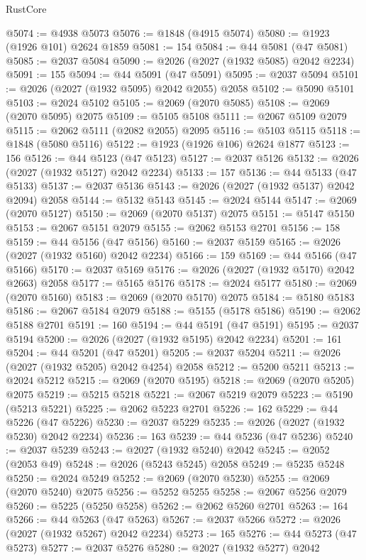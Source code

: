 \begin{lexlean}{RustCore}
\begin{coremodule}
@5074 := @4938 @5073
@5076 := @1848 (@4915 @5074)
@5080 := @1923 (@1926 @101) @2624 @1859
@5081 := 154
@5084 := @44 @5081 (@47 @5081)
@5085 := @2037 @5084
@5090 := @2026 (@2027 (@1932 @5085) @2042 @2234)
@5091 := 155
@5094 := @44 @5091 (@47 @5091)
@5095 := @2037 @5094
@5101 := @2026 (@2027 (@1932 @5095) @2042 @2055) @2058
@5102 := @5090 @5101
@5103 := @2024 @5102
@5105 := @2069 (@2070 @5085)
@5108 := @2069 (@2070 @5095) @2075
@5109 := @5105 @5108
@5111 := @2067 @5109 @2079
@5115 := @2062 @5111 (@2082 @2055) @2095
@5116 := @5103 @5115
@5118 := @1848 (@5080 @5116)
@5122 := @1923 (@1926 @106) @2624 @1877
@5123 := 156
@5126 := @44 @5123 (@47 @5123)
@5127 := @2037 @5126
@5132 := @2026 (@2027 (@1932 @5127) @2042 @2234)
@5133 := 157
@5136 := @44 @5133 (@47 @5133)
@5137 := @2037 @5136
@5143 := @2026 (@2027 (@1932 @5137) @2042 @2094) @2058
@5144 := @5132 @5143
@5145 := @2024 @5144
@5147 := @2069 (@2070 @5127)
@5150 := @2069 (@2070 @5137) @2075
@5151 := @5147 @5150
@5153 := @2067 @5151 @2079
@5155 := @2062 @5153 @2701
@5156 := 158
@5159 := @44 @5156 (@47 @5156)
@5160 := @2037 @5159
@5165 := @2026 (@2027 (@1932 @5160) @2042 @2234)
@5166 := 159
@5169 := @44 @5166 (@47 @5166)
@5170 := @2037 @5169
@5176 := @2026 (@2027 (@1932 @5170) @2042 @2663) @2058
@5177 := @5165 @5176
@5178 := @2024 @5177
@5180 := @2069 (@2070 @5160)
@5183 := @2069 (@2070 @5170) @2075
@5184 := @5180 @5183
@5186 := @2067 @5184 @2079
@5188 := @5155 (@5178 @5186)
@5190 := @2062 @5188 @2701
@5191 := 160
@5194 := @44 @5191 (@47 @5191)
@5195 := @2037 @5194
@5200 := @2026 (@2027 (@1932 @5195) @2042 @2234)
@5201 := 161
@5204 := @44 @5201 (@47 @5201)
@5205 := @2037 @5204
@5211 := @2026 (@2027 (@1932 @5205) @2042 @4254) @2058
@5212 := @5200 @5211
@5213 := @2024 @5212
@5215 := @2069 (@2070 @5195)
@5218 := @2069 (@2070 @5205) @2075
@5219 := @5215 @5218
@5221 := @2067 @5219 @2079
@5223 := @5190 (@5213 @5221)
@5225 := @2062 @5223 @2701
@5226 := 162
@5229 := @44 @5226 (@47 @5226)
@5230 := @2037 @5229
@5235 := @2026 (@2027 (@1932 @5230) @2042 @2234)
@5236 := 163
@5239 := @44 @5236 (@47 @5236)
@5240 := @2037 @5239
@5243 := @2027 (@1932 @5240) @2042
@5245 := @2052 (@2053 @49)
@5248 := @2026 (@5243 @5245) @2058
@5249 := @5235 @5248
@5250 := @2024 @5249
@5252 := @2069 (@2070 @5230)
@5255 := @2069 (@2070 @5240) @2075
@5256 := @5252 @5255
@5258 := @2067 @5256 @2079
@5260 := @5225 (@5250 @5258)
@5262 := @2062 @5260 @2701
@5263 := 164
@5266 := @44 @5263 (@47 @5263)
@5267 := @2037 @5266
@5272 := @2026 (@2027 (@1932 @5267) @2042 @2234)
@5273 := 165
@5276 := @44 @5273 (@47 @5273)
@5277 := @2037 @5276
@5280 := @2027 (@1932 @5277) @2042

\end{coremodule}
\end{lexlean}

